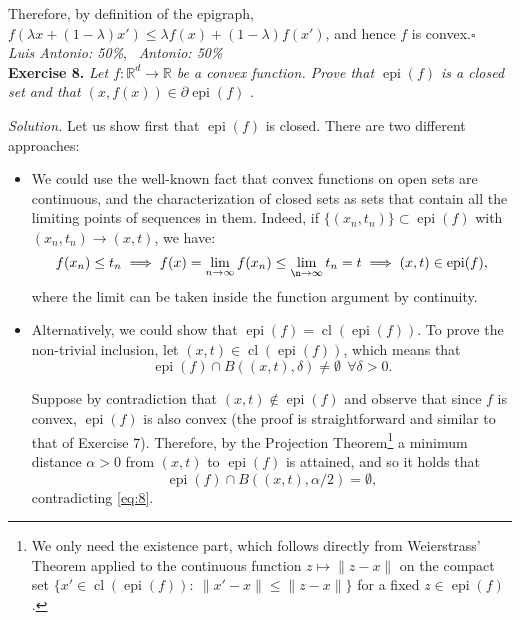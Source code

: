 \documentclass[12pt]{article}
\newcommand*{\QED}{\null\nobreak\hfill\ensuremath{\square}}%
\begin{document}
Therefore, by definition of the epigraph, \( f(\lambda x + (1-\lambda)x') \leq \lambda f(x) + (1-\lambda)f(x')\), and hence $f$ is convex.\QED\\

\textit{Luis Antonio: 50\%}, \ \textit{Antonio: 50\%}\\
\textbf{Exercise 8.} \emph{Let \( f : \mathbb{R}^d \to \mathbb{R} \) be a convex function. Prove that \( \operatorname{epi}(f) \) is a closed set and that \( (x, f(x)) \in \partial \operatorname{epi}(f) \)  }.

\emph{Solution.} Let us show first that \( \operatorname{epi}(f)  \) is closed. There are two different approaches:

\begin{itemize}
  \item We could use the well-known fact that convex functions on open sets are continuous, and the characterization of closed sets as sets that contain all the limiting points of sequences in them. Indeed, if $\{(x_n, t_n)\}\subset \operatorname{epi}(f)$ with $(x_n, t_n)\to (x, t)$, we have:
  \[
  f(x_n) \leq t_n \implies f(x)=\lim_{n\to\infty} f(x_n) \leq \lim_{\n\to\infty} t_n = t \implies (x, t) \in \operatorname{epi}(f),
  \]
  where the limit can be taken inside the function argument by continuity.
\item Alternatively, we could show that \( \operatorname{epi}(f)  = \operatorname{cl}(\operatorname{epi}(f) ) \). To prove the non-trivial inclusion, let \( (x,t) \in \operatorname{cl}(\operatorname{epi}(f) ) \), which means that
\begin{equation}
  \label{eq:8}
\operatorname{epi}(f) \cap B((x,t), \delta) \neq \emptyset \ \ \forall \delta > 0.
\end{equation}

Suppose by contradiction that $(x, t) \notin \operatorname{epi}(f)$ and observe that since $f$ is convex, $\operatorname{epi}(f)$ is also convex (the proof is straightforward and similar to that of Exercise 7). Therefore, by the Projection Theorem\footnote{We only need the existence part, which follows directly from Weierstrass' Theorem applied to the continuous function $z\mapsto \lVert z - x \rVert$ on the compact set $\{x' \in \operatorname{cl}(\operatorname{epi}(f)): \ \lVert x' - x \rVert \leq \lVert z - x \rVert\}$ for a fixed $z\in \operatorname{epi}(f)$.} a minimum distance $\alpha > 0$ from $(x, t)$ to $\operatorname{epi}(f)$ is attained, and so it holds that
\[
\operatorname{epi}(f) \cap B((x, t), \alpha/2) = \emptyset,
\]
contradicting \eqref{eq:8}.
\end{itemize}
\end{document}
